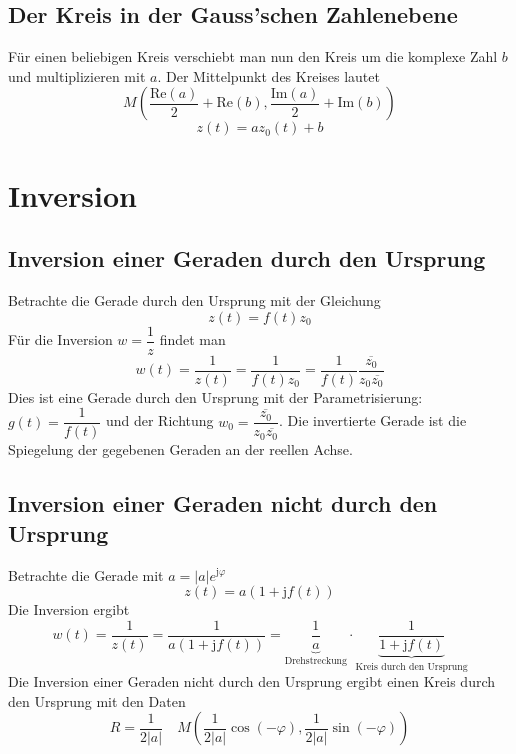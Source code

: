 \subsection{Der Kreis in der Gauss'schen Zahlenebene}
Für einen beliebigen Kreis verschiebt man nun den Kreis um die komplexe Zahl $b$ und multiplizieren mit $a$. Der Mittelpunkt des Kreises lautet
\begin{equation}
\boxed{M\left(\dfrac{\text{Re}\left(a\right)}{2}+\text{Re}\left(b\right), \dfrac{\text{Im}\left(a\right)}{2}+\text{Im}\left(b\right)\right)}
\end{equation}
\begin{equation}
\boxed{z\left(t\right)=az_0\left(t\right)+b}
\end{equation}
\section{Inversion}
\subsection{Inversion einer Geraden durch den Ursprung}
Betrachte die Gerade durch den Ursprung mit der Gleichung
\begin{equation} 
\boxed{z\left(t\right)=f\left(t\right)z_0}
\end{equation} \tabularnewline
Für die Inversion $w=\dfrac{1}{z}$ findet man
\begin{equation}
\boxed{w\left(t\right)=\dfrac{1}{z\left(t\right)}=\dfrac{1}{f\left(t\right)z_0}=\dfrac{1}{f\left(t\right)}\dfrac{\overline{z_0}}{z_0\overline{z_0}}}
\end{equation}
Dies ist eine Gerade durch den Ursprung mit der Parametrisierung: $g\left(t\right)=\dfrac{1}{f\left(t\right)}$ und der Richtung $w_0=\dfrac{\overline{z_0}}{z_0\overline{z_0}}$. Die invertierte Gerade ist die Spiegelung der gegebenen Geraden an der reellen Achse.
\subsection{Inversion einer Geraden nicht durch den Ursprung}
Betrachte die Gerade mit $a=\Big\vert a\Big\vert e^{\text{j}\varphi}$
\begin{equation}
\boxed{z\left(t\right)=a\left(1+\text{j} f\left(t\right)\right)}
\end{equation}
Die Inversion ergibt
\begin{equation}
\boxed{w\left(t\right)=\dfrac{1}{z\left(t\right)}=\dfrac{1}{a\left(1+\text{j}f\left(t\right)\right)}=\underbrace{\dfrac{1}{a}}_{\text{Drehstreckung}}\cdot \underbrace{\dfrac{1}{1+\text{j}f\left(t\right)}}_{\text{Kreis durch den Ursprung}}}
\end{equation}
Die Inversion einer Geraden nicht durch den Ursprung ergibt einen Kreis durch den Ursprung mit den Daten
\begin{equation}
\boxed{R=\dfrac{1}{2\Big\vert a \Big\vert}}\quad \boxed{M\left(\dfrac{1}{2\Big\vert a\Big\vert}\cos\left(-\varphi\right), \dfrac{1}{2\Big\vert a\Big\vert}\sin\left(-\varphi\right)\right)}
\end{equation}
